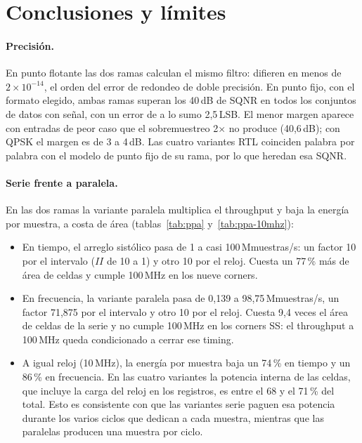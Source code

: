 \section{Conclusiones y límites}\label{sec:conclusiones}

\paragraph{Precisión.} En punto flotante las dos ramas calculan el mismo filtro: difieren en menos de $2\times10^{-14}$, el orden del error de redondeo de doble precisión. En punto fijo, con el formato elegido, ambas ramas superan los 40\,dB de SQNR en todos los conjuntos de datos con señal, con un error de a lo sumo 2,5\,LSB. El menor margen aparece con entradas de peor caso que el sobremuestreo 2× no produce (40,6\,dB); con QPSK el margen es de 3 a 4\,dB. Las cuatro variantes RTL coinciden palabra por palabra con el modelo de punto fijo de su rama, por lo que heredan esa SQNR.

\paragraph{Serie frente a paralela.} En las dos ramas la variante paralela multiplica el throughput y baja la energía por muestra, a costa de área (tablas~\ref{tab:ppa} y~\ref{tab:ppa-10mhz}):
\begin{itemize}
  \item En tiempo, el arreglo sistólico pasa de 1 a casi 100\,Mmuestras/s: un factor 10 por el intervalo ($II$ de 10 a 1) y otro 10 por el reloj. Cuesta un 77\,\% más de área de celdas y cumple 100\,MHz en los nueve corners.
  \item En frecuencia, la variante paralela pasa de 0,139 a 98,75\,Mmuestras/s, un factor 71,875 por el intervalo y otro 10 por el reloj. Cuesta 9,4 veces el área de celdas de la serie y no cumple 100\,MHz en los corners SS: el throughput a 100\,MHz queda condicionado a cerrar ese timing.
  \item A igual reloj (10\,MHz), la energía por muestra baja un 74\,\% en tiempo y un 86\,\% en frecuencia. En las cuatro variantes la potencia interna de las celdas, que incluye la carga del reloj en los registros, es entre el 68 y el 71\,\% del total. Esto es consistente con que las variantes serie paguen esa potencia durante los varios ciclos que dedican a cada muestra, mientras que las paralelas producen una muestra por ciclo.
\end{itemize}


